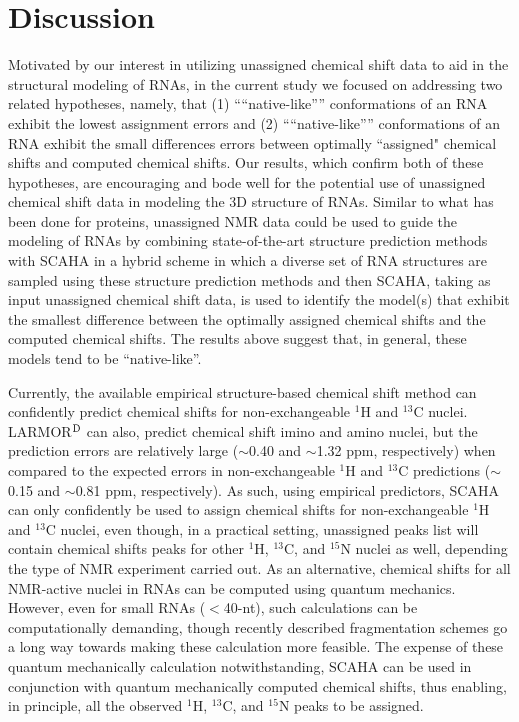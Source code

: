 \documentclass[journal=jcisd8,manuscript=article,layout=onecolumn]{achemso}
\begin{document}
\section{Discussion} 
Motivated by our interest in utilizing unassigned chemical shift data to aid in the structural modeling of RNAs, in the current study we focused on addressing two related hypotheses, namely, that (1) ````native-like''” conformations of an RNA exhibit the lowest assignment errors and (2)  ````native-like''” conformations of an RNA exhibit the small differences errors between optimally ``assigned" chemical shifts and computed chemical shifts. Our results, which confirm both of these hypotheses, are encouraging and bode well for the potential use of unassigned chemical shift data in modeling the 3D structure of RNAs. Similar to what has been done for proteins\cite{meiler2003rapid, bermejo2008deuterated, courtney2015experimental}, unassigned NMR data could be used to guide the modeling of RNAs by combining state-of-the-art structure prediction methods with SCAHA in a hybrid scheme in which a diverse set of RNA structures are sampled using these structure prediction methods and then SCAHA, taking as input unassigned chemical shift data, is used to identify the model(s) that exhibit the smallest difference between the optimally assigned chemical shifts and the computed chemical shifts. The results above suggest that, in general, these models tend to be ``native-like''. %

Currently, the available empirical structure-based chemical shift method can confidently predict chemical shifts for non-exchangeable $^{1}$H and $^{13}$C nuclei. LARMOR$^{\rm D}$ can also, predict chemical shift imino and amino nuclei, but the prediction errors are relatively large ($\sim$0.40 and $\sim$1.32 ppm, respectively)\cite{frank2014simple} when compared to the expected errors in non-exchangeable $^{1}$H and $^{13}$C predictions ($\sim$0.15 and $\sim$0.81 ppm, respectively)\cite{frank2014simple}. As such, using empirical predictors, SCAHA can only confidently be used to assign chemical shifts for non-exchangeable $^{1}$H and $^{13}$C nuclei, even though, in a practical setting, unassigned peaks list will contain chemical shifts peaks for other $^{1}$H, $^{13}$C,  and $^{15}$N nuclei as well, depending the type of NMR experiment carried out. As an alternative, chemical shifts for all NMR-active nuclei in RNAs can be computed using quantum mechanics. However, even for small RNAs ($<$40-nt), such calculations can be computationally demanding, though recently described fragmentation schemes go a long way towards making these calculation more feasible\cite{swails2015afnmr}. The expense of these quantum mechanically calculation notwithstanding, SCAHA can be used in conjunction with quantum mechanically computed chemical shifts, thus enabling, in principle, all the observed  $^{1}$H, $^{13}$C,  and $^{15}$N peaks to be assigned.
\end{document}
